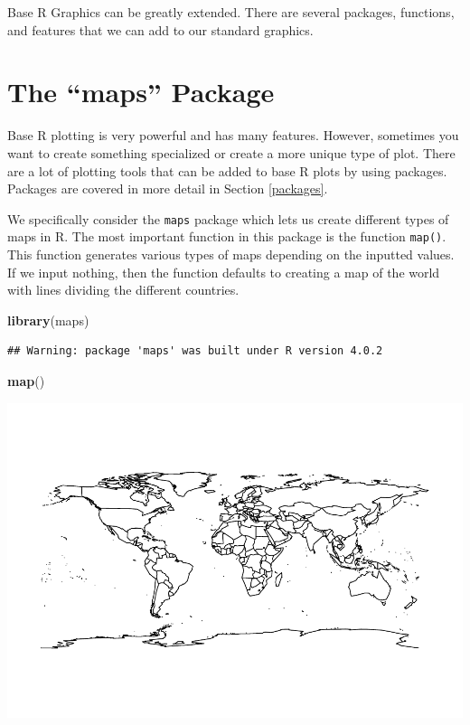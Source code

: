 \documentclass[
]{book}
\newenvironment{Shaded}{\begin{snugshade}}{\end{snugshade}}
\newcommand{\KeywordTok}[1]{\textcolor[rgb]{0.13,0.29,0.53}{\textbf{#1}}}
\newcommand{\NormalTok}[1]{#1}
\begin{document}
Base R Graphics can be greatly extended. There are several packages, functions, and features that we can add to our standard graphics.

\hypertarget{the-maps-package}{%
\section{The ``maps'' Package}\label{the-maps-package}}

Base R plotting is very powerful and has many features. However, sometimes you want to create something specialized or create a more unique type of plot. There are a lot of plotting tools that can be added to base R plots by using packages. Packages are covered in more detail in Section \ref{packages}.

We specifically consider the \texttt{maps} package which lets us create different types of maps in R. The most important function in this package is the function \texttt{map()}. This function generates various types of maps depending on the inputted values. If we input nothing, then the function defaults to creating a map of the world with lines dividing the different countries.

\begin{Shaded}
\begin{Highlighting}[]
\KeywordTok{library}\NormalTok{(maps)}
\end{Highlighting}
\end{Shaded}

\begin{verbatim}
## Warning: package 'maps' was built under R version 4.0.2
\end{verbatim}

\begin{Shaded}
\begin{Highlighting}[]
\KeywordTok{map}\NormalTok{()}
\end{Highlighting}
\end{Shaded}

\includegraphics{_main_files/figure-latex/unnamed-chunk-194-1.pdf}
\end{document}
